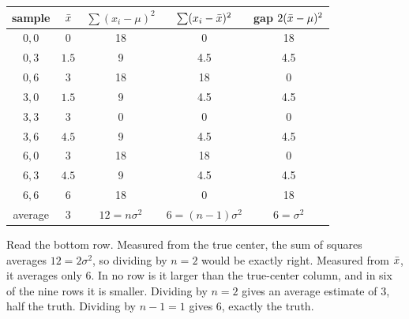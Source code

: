 \begin{center}
\renewcommand{\arraystretch}{1.1}
\begin{tabular}{c c c c c}
\toprule
sample & $\bar{x}$ & $\sum (x_i-\mu)^2$ & $\sum (x_i-\bar{x})^2$ & gap $2(\bar{x}-\mu)^2$ \\
\midrule
$0,0$ & $0$   & 18 & 0    & 18 \\
$0,3$ & $1.5$ & 9  & 4.5  & 4.5 \\
$0,6$ & $3$   & 18 & 18   & 0 \\
$3,0$ & $1.5$ & 9  & 4.5  & 4.5 \\
$3,3$ & $3$   & 0  & 0    & 0 \\
$3,6$ & $4.5$ & 9  & 4.5  & 4.5 \\
$6,0$ & $3$   & 18 & 18   & 0 \\
$6,3$ & $4.5$ & 9  & 4.5  & 4.5 \\
$6,6$ & $6$   & 18 & 0    & 18 \\
\midrule
average & $3$ & $12 = n\sigma^2$ & $6 = (n-1)\sigma^2$ & $6 = \sigma^2$ \\
\bottomrule
\end{tabular}
\end{center}

Read the bottom row. Measured from the true center, the sum of squares averages
$12 = 2\sigma^2$, so dividing by $n=2$ would be exactly right. Measured from $\bar{x}$,
it averages only $6$. In no row is it larger than the true-center column, and in
six of the nine rows it is smaller. Dividing by $n=2$ gives an average estimate of $3$, half
the truth. Dividing by $n-1=1$ gives $6$, exactly the truth.

